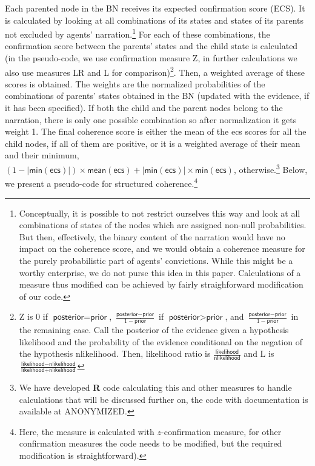 \documentclass[
  10pt,
]{scrartcl}
\newcommand{\s}[1]{\textsf{#1}}
\begin{document}
Each parented node in the BN receives its expected confirmation score (\s{ECS}). It is calculated by looking at all combinations of its states and states of its parents not excluded by agents' narration.\footnote{Conceptually, it is possible to not restrict ourselves this way and look at all combinations of states of the nodes which are assigned non-null probabilities. But then, effectively, the binary content of the narration would have no impact on the coherence score, and we would obtain a coherence measure for the purely probabilistic part of agents' convictions. While this might be a worthy enterprise, we do not purse this idea in this paper. Calculations of a measure thus modified can be achieved by fairly straighforward modification of our code.} For each of these combinations, the confirmation score between the parents' states and the child state is calculated (in the pseudo-code, we use confirmation measure \s{Z}, in further calculations we also use measures \s{LR} and \s{L} for comparison)\footnote{\s{Z} is \(0\) if \(\s{posterior} = \s{prior}\), \(\frac{\s{posterior} - \s{prior}}{1 - \s{prior}}\) if \({\s{posterior} > \s{prior}}\), and \(\frac{\s{posterior} - \s{prior}}{1 - \s{prior}}\) in the remaining case. Call the posterior of the evidence given a hypothesis \s{likelihood} and the probability of the evidence conditional on the negation of the hypothesis \s{nlikelihood}. Then, likelihood ratio is
  \(\frac{\s{likelihood}}{\s{nlikelihood}}\) and \s{L} is \(\frac{\s{likelihood} - \s{nlikelihood}}{\s{likelihood} + \s{nlikelihood}}\)}. Then, a weighted average of these scores is obtained. The weights are the normalized probabilities of the combinations of parents' states obtained in the BN (updated with the evidence, if it has been specified). If both the child and the parent nodes belong to the narration, there is only one possible combination so after normalization it gets weight 1. The final coherence score is either the mean of the \s{ecs} scores for all the child nodes, if all of them are positive, or it is a weighted average of their mean and their minimum, \((1- |\s{min}(\s{ecs})|) \times \s{mean}(\s{ecs}) + |\s{min}(\s{ecs})| \times \s{min}(\s{ecs})\), otherwise.\footnote{We have developed \textbf{\textsf{R}} code calculating this and other measures to handle calculations that will be discussed further on, the code with documentation is available at ANONYMIZED.} Below, we present a pseudo-code for structured coherence.\footnote{Here, the measure is calculated with \(z\)-confirmation measure, for other confirmation measures the code needs to be modified, but the required modification is straightforward).}
\end{document}
